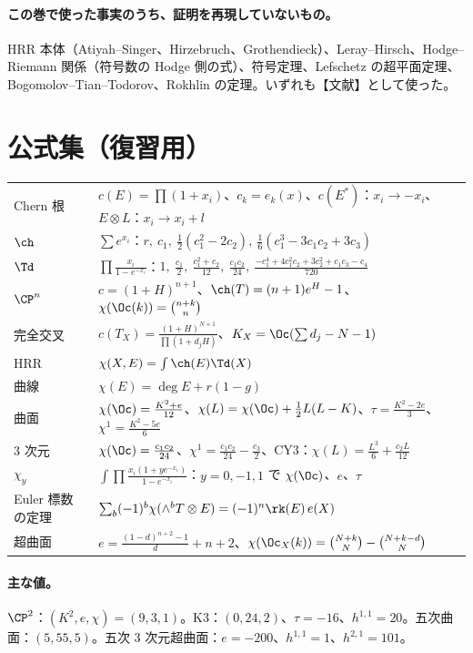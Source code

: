 \paragraph{この巻で使った事実のうち、証明を再現していないもの。}HRR 本体（Atiyah--Singer、Hirzebruch、Grothendieck）、Leray--Hirsch、Hodge--Riemann 関係（符号数の Hodge 側の式）、符号定理、Lefschetz の超平面定理、Bogomolov--Tian--Todorov、Rokhlin の定理。いずれも【文献】として使った。


\section*{公式集（復習用）}
\begin{center}
\begin{tabular}{l|l}
\toprule
Chern 根 & $c(E)=\prod(1+x_i)$、$c_k=e_k(x)$、$c(E^*)$：$x_i\to-x_i$、$E\otimes L$：$x_i\to x_i+l$\\
$\ch$ & $\sum e^{x_i}$：$r,\ c_1,\ \frac12(c_1^2-2c_2),\ \frac16(c_1^3-3c_1c_2+3c_3)$\\
$\Td$ & $\prod\frac{x_i}{1-e^{-x_i}}$：$1,\ \frac{c_1}2,\ \frac{c_1^2+c_2}{12},\ \frac{c_1c_2}{24},\ \frac{-c_1^4+4c_1^2c_2+3c_2^2+c_1c_3-c_4}{720}$\\
$\CP^n$ & $c=(1+H)^{n+1}$、$\ch(T)=(n+1)e^H-1$、$\chi(\Oc(k))=\binom{n+k}n$\\
完全交叉 & $c(T_X)=\frac{(1+H)^{N+1}}{\prod(1+d_jH)}$、$K_X=\Oc(\sum d_j-N-1)$\\
HRR & $\chi(X,E)=\int\ch(E)\Td(X)$\\
曲線 & $\chi(E)=\deg E+r(1-g)$\\
曲面 & $\chi(\Oc)=\frac{K^2+e}{12}$、$\chi(L)=\chi(\Oc)+\frac12L(L-K)$、$\tau=\frac{K^2-2e}3$、$\chi^1=\frac{K^2-5e}6$\\
3 次元 & $\chi(\Oc)=\frac{c_1c_2}{24}$、$\chi^1=\frac{c_1c_2}{24}-\frac{c_3}2$、CY3：$\chi(L)=\frac{L^3}6+\frac{c_2L}{12}$\\
$\chi_y$ & $\int\prod\frac{x_i(1+ye^{-x_i})}{1-e^{-x_i}}$：$y=0,-1,1$ で $\chi(\Oc)$、$e$、$\tau$\\
Euler 標数の定理 & $\sum_b(-1)^b\chi(\wedge^bT\otimes E)=(-1)^n\rk(E)\,e(X)$\\
超曲面 & $e=\frac{(1-d)^{n+2}-1}d+n+2$、$\chi(\Oc_X(k))=\binom{N+k}N-\binom{N+k-d}N$\\
\bottomrule
\end{tabular}
\end{center}
\paragraph{主な値。}$\CP^2$：$(K^2,e,\chi)=(9,3,1)$。K3：$(0,24,2)$、$\tau=-16$、$h^{1,1}=20$。五次曲面：$(5,55,5)$。五次 3 次元超曲面：$e=-200$、$h^{1,1}=1$、$h^{2,1}=101$。
